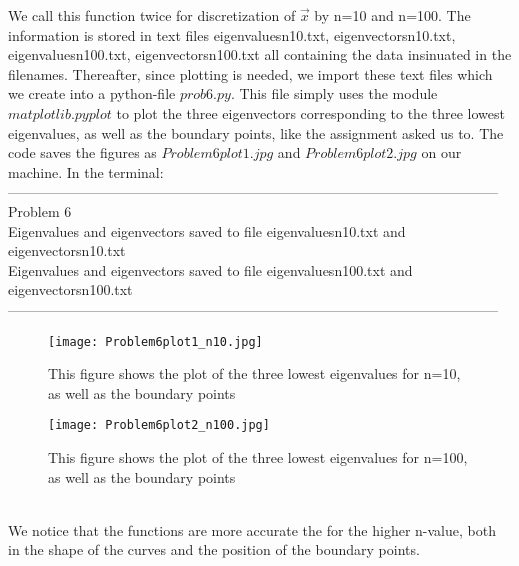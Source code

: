 \documentclass{article} %
\begin{document}
  We call this function twice for discretization of $\vec{x}$ by n=10 and n=100. The information is stored in text files eigenvaluesn10.txt, 
  eigenvectorsn10.txt, eigenvaluesn100.txt, eigenvectorsn100.txt all containing the data insinuated in the filenames. Thereafter, since plotting is needed, 
  we import these text files which we create into a python-file $prob6.py$. This file simply uses the module $matplotlib.pyplot$ to plot the 
  three eigenvectors corresponding to the three lowest eigenvalues, as well as the boundary points, like the assignment asked us to. 
  The code saves the figures as $Problem6plot1.jpg$ and $Problem6plot2.jpg$ on our machine.
  In the terminal: \\
  ---------------------------------------------------------------------------------------------------------
  Problem 6 \\
  Eigenvalues and eigenvectors saved to file eigenvaluesn10.txt and eigenvectorsn10.txt \\
  Eigenvalues and eigenvectors saved to file eigenvaluesn100.txt and eigenvectorsn100.txt \\
  --------------------------------------------------------------------------------------------------------- \\
  \begin{figure}[htb]
    \begin{center}
      \texttt{[image: Problem6plot1\_n10.jpg]}
      \caption{This figure shows the plot of the three lowest eigenvalues for n=10, as well as the boundary points}
    \end{center}
  \end{figure}
  \begin{figure}[htb]
    \begin{center}
      \texttt{[image: Problem6plot2\_n100.jpg]}
      \caption{This figure shows the plot of the three lowest eigenvalues for n=100, as well as the boundary points}
    \end{center}
  \end{figure}
  \\
  We notice that the functions are more accurate the for the higher n-value, both in the shape of the curves and the position
  of the boundary points. 
\end{document}
